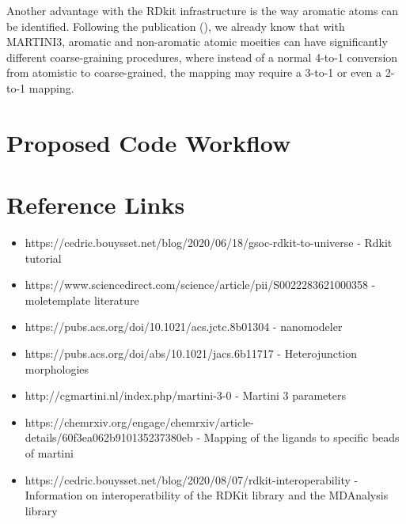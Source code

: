 \documentclass[12pt]{article}
\begin{document}
Another advantage with the RDkit infrastructure is the way aromatic atoms can be identified. Following the publication (), we already know that with MARTINI3, aromatic and non-aromatic
atomic moeities can have significantly different coarse-graining procedures, where instead of a normal 4-to-1 conversion from atomistic to coarse-grained, the mapping may require a 3-to-1 or even
a 2-to-1 mapping.

\section{Proposed Code Workflow}

\section{Reference Links}

\begin{itemize}
\item https://cedric.bouysset.net/blog/2020/06/18/gsoc-rdkit-to-universe - Rdkit tutorial

\item https://www.sciencedirect.com/science/article/pii/S0022283621000358 - moletemplate literature

\item https://pubs.acs.org/doi/10.1021/acs.jctc.8b01304 - nanomodeler

\item https://pubs.acs.org/doi/abs/10.1021/jacs.6b11717 - Heterojunction morphologies 

\item http://cgmartini.nl/index.php/martini-3-0 - Martini 3 parameters

\item https://chemrxiv.org/engage/chemrxiv/article-details/60f3ea062b910135237380eb - Mapping of the ligands to specific beads of martini

\item https://cedric.bouysset.net/blog/2020/08/07/rdkit-interoperability - Information on interoperatbility of the RDKit library and the MDAnalysis library
\end{itemize}



\end{document}
